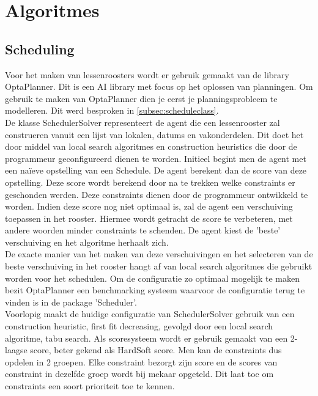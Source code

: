 \section{Algoritmes}
\label{sec:algorithms}
\subsection{Scheduling}
\label{subsec:scheduling}
Voor het maken van lessenroosters wordt er gebruik gemaakt van de library OptaPlanner\cite{optaplanner}. 
Dit is een AI library met focus op het oplossen van planningen.
Om gebruik te maken van OptaPlanner dien je eerst je planningsprobleem te modelleren.
Dit werd besproken in \ref{subsec:scheduleclass}.\\

De klasse SchedulerSolver representeert de agent die een lessenrooster zal construeren vanuit een lijst van lokalen, datums en vakonderdelen.
Dit doet het door middel van local search algoritmes en construction heuristics die door de programmeur geconfigureerd dienen te worden.
Initieel begint men de agent met een na\"{i}eve opstelling van een Schedule.
De agent berekent dan de score van deze opstelling.
Deze score wordt berekend door na te trekken welke constraints er geschonden werden.
Deze constraints dienen door de programmeur ontwikkeld te worden.
Indien deze score nog niet optimaal is, zal de agent een verschuiving toepassen in het rooster.
Hiermee wordt getracht de score te verbeteren, met andere woorden minder constraints te schenden.
De agent kiest de 'beste' verschuiving en het algoritme herhaalt zich.\\

De exacte manier van het maken van deze verschuivingen en het selecteren van de beste verschuiving in het rooster hangt af van local search algoritmes die gebruikt worden voor het schedulen.
Om de configuratie zo optimaal mogelijk te maken bezit OptaPlanner een benchmarking systeem waarvoor de configuratie terug te vinden is in de package 'Scheduler'.\\

Voorlopig maakt de huidige configuratie van SchedulerSolver gebruik van een construction heuristic, first fit decreasing, gevolgd door een local search algoritme, tabu search. 
Als scoresysteem wordt er gebruik gemaakt van een 2-laagse score, beter gekend als HardSoft score.
Men kan de constraints dus opdelen in 2 groepen.
Elke constraint bezorgt zijn score en de scores van constraint in dezelfde groep wordt bij mekaar opgeteld.
Dit laat toe om constraints een soort prioriteit toe te kennen.\\

